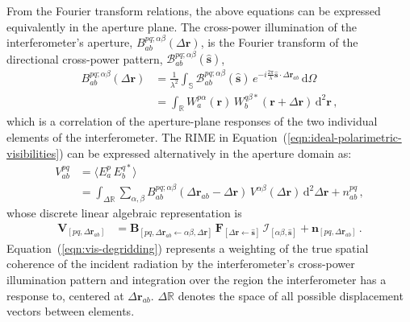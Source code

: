 \documentclass[
  journal=pasa,
  manuscript=article-type,
  year=2020,
  volume=37,
]{cup-journal}
\begin{document}
From the Fourier transform relations, the above equations can be expressed equivalently in the aperture plane. The cross-power illumination of the interferometer's aperture, $B_{ab}^{pq;\alpha\beta}(\Delta\boldsymbol{r})$, is the Fourier transform of the directional cross-power pattern, $\mathcal{B}_{ab}^{pq;\alpha\beta}(\hat{\boldsymbol{s}})$,
\begin{align}
    B_{ab}^{pq;\alpha\beta}(\Delta\boldsymbol{r}) &= \frac{1}{\lambda^2}\int_\mathbb{S} \mathcal{B}_{ab}^{pq;\alpha\beta}(\hat{\boldsymbol{s}}) \, e^{-i\frac{2\pi}{\lambda} \hat{\boldsymbol{s}}\cdot \Delta\boldsymbol{r}_{ab}} \,\mathrm{d}\Omega \label{eqn:holographic-power-illumination} \\
    &= \int_\mathbb{R} W_{a}^{p\alpha}(\boldsymbol{r}) \, W_{b}^{q\beta *}(\boldsymbol{r}+\Delta\boldsymbol{r})\,\mathrm{d}^2\boldsymbol{r} \, ,
\end{align}
which is a correlation of the aperture-plane responses of the two individual elements of the interferometer. The RIME in Equation~(\ref{eqn:ideal-polarimetric-visibilities}) can be expressed alternatively in the aperture domain as:
\begin{align}
    V_{ab}^{pq} &= \bigl\langle E_{a}^p \, E_{b}^{q*}\bigr\rangle\\ 
    &= \int_{\Delta\mathbb{R}} \sum_{\alpha,\beta} B_{ab}^{pq;\alpha\beta}(\Delta\boldsymbol{r}_{ab}-\Delta\boldsymbol{r})\,V^{\alpha\beta}(\Delta\boldsymbol{r})\,\mathrm{d}^2\Delta\boldsymbol{r}  + n_{ab}^{pq} \, , \label{eqn:vis-degridding}
\end{align}
whose discrete linear algebraic representation is
\begin{align}
    \mathbf{V}_{[pq,\Delta\boldsymbol{r}_{ab}]} &= \mathbf{B}_{[pq,\Delta\boldsymbol{r}_{ab}\leftarrow \alpha\beta,\Delta\boldsymbol{r}]} \, \mathbf{F}_{[\Delta\boldsymbol{r}\leftarrow \hat{\boldsymbol{s}}]} \, \boldsymbol{\mathcal{I}}_{[\alpha\beta,\hat{\boldsymbol{s}}]} + \mathbf{n}_{[pq,\Delta\boldsymbol{r}_{ab}]} \, .
\end{align}
Equation~(\ref{eqn:vis-degridding}) represents a weighting of the true spatial coherence of the incident radiation by the interferometer's cross-power illumination pattern and integration over the region the interferometer has a response to, centered at $\Delta\boldsymbol{r}_{ab}$. $\Delta\mathbb{R}$ denotes the space of all possible displacement vectors between elements. 
\end{document}
